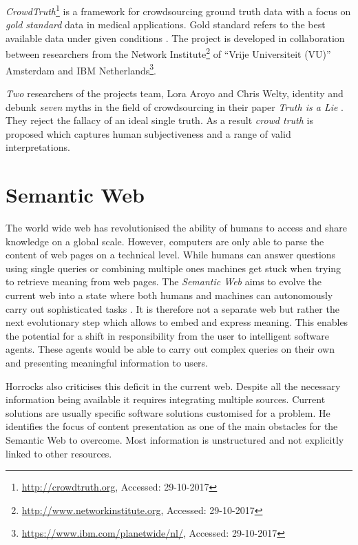 \textit{CrowdTruth}\footnote{\url{http://crowdtruth.org}, Accessed: 29-10-2017} is a framework for crowdsourcing ground truth data with a focus on \textit{gold standard} data in medical applications.
Gold standard refers to the best available data under given conditions \cite{Versi1992a}.
The project is developed in collaboration between researchers from the Network Institute\footnote{\url{http://www.networkinstitute.org}, Accessed: 29-10-2017} of \enquote{Vrije Universiteit (VU)} Amsterdam and IBM Netherlands\footnote{\url{https://www.ibm.com/planetwide/nl/}, Accessed: 29-10-2017}.

\textit{Two} researchers of the projects team, Lora Aroyo and Chris Welty, identity and debunk \textit{seven} myths in the field of crowdsourcing in their paper \textit{Truth is a Lie} \cite{Aroyo2015a}.
They reject the fallacy of an ideal single truth.
As a result \textit{crowd truth} is proposed which captures human subjectiveness and a range of valid interpretations.

\section{Semantic Web} \label{semantic-web}
The world wide web has revolutionised the ability of humans to access and share knowledge on a global scale.
However, computers are only able to parse the content of web pages on a technical level.
While humans can answer questions using single queries or combining multiple ones machines get stuck when trying to retrieve meaning from web pages.
The \textit{Semantic Web} aims to evolve the current web into a state where both humans and machines can autonomously carry out sophisticated tasks \cite{Berners-lee2002b}.
It is therefore not a separate web but rather the next evolutionary step which allows to embed and express meaning.
This enables the potential for a shift in responsibility from the user to intelligent software agents.
These agents would be able to carry out complex queries on their own and presenting meaningful information to users.

Horrocks \cite{Horrocks2003b} also criticises this deficit in the current web.
Despite all the necessary information being available it requires integrating multiple sources.
Current solutions are usually specific software solutions customised for a problem.
He identifies the focus of content presentation as one of the main obstacles for the Semantic Web to overcome.
Most information is unstructured and not explicitly linked to other resources.

